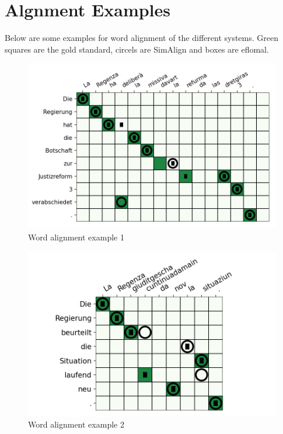 \chapter{Algnment Examples}\label{appendix-a}
Below are some examples for word alignment of the different systems. 
Green squares are the gold standard, circels are SimAlign and boxes are eflomal.

\begin{figure}[ht]
\includegraphics{graphics/alignments/example1.png}
\caption{Word alignment example 1}
\end{figure}

\begin{figure}[ht]
\includegraphics{graphics/alignments/example2.png}
\caption{Word alignment example 2}
\end{figure}

